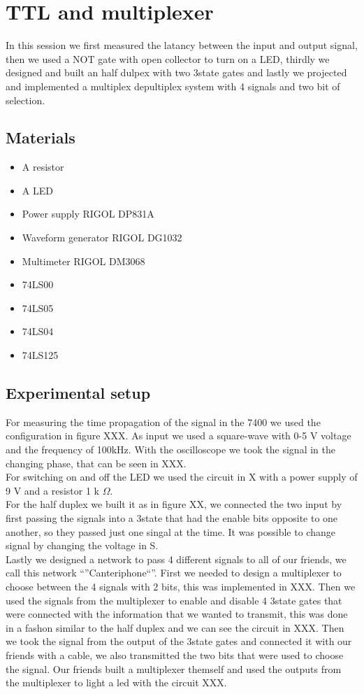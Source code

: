 \chapter{TTL and multiplexer}
In this session we first measured the latancy between the input and output signal, then we used a NOT gate with open collector to turn on a LED, thirdly we designed and built an half dulpex with two 3state gates and lastly we projected and implemented a multiplex depultiplex system with 4 signals and two bit of selection.

\section{Materials}
\begin{itemize}
\item A resistor
\item A LED
\item Power supply RIGOL DP831A
\item Waveform generator RIGOL DG1032
\item Multimeter RIGOL DM3068
\item 74LS00
\item 74LS05
\item 74LS04
\item 74LS125
\end{itemize}

\section{Experimental setup}
For measuring the time propagation of the signal in the 7400 we used the configuration in figure XXX. As input we used a square-wave with 0-5 V voltage and the frequency of 100kHz. With the oscilloscope we took the signal in the changing phase, that can be seen in XXX.\\
For switching on and off the LED we used the circuit in X with a power supply of 9 V and a resistor 1  k $\Omega$.\\
For the half duplex we built it as in figure XX, we connected the two input by first passing the signals into a  3state that had the enable bits opposite to one another, so they passed just one singal at the time. It was possible to change signal by changing the voltage in S.\\
Lastly we designed a network to pass 4 different signals to all of our friends, we call this network ``''Canteriphone``''. First we needed to design a multiplexer to choose between the 4 signals with 2 bits, this was implemented in XXX. Then we used the signals from the multiplexer to enable and disable 4 3state gates that were connected with the information that we wanted to transmit, this was done in a fashon similar to the half duplex and we can see the circuit in XXX. Then we took the signal from the output of the 3state gates and connected it with our friends with a cable, we also transmitted the two bits that were used to choose  the signal. Our friends built a multiplexer themself and used the outputs from the multiplexer to light a led with the circuit XXX.

